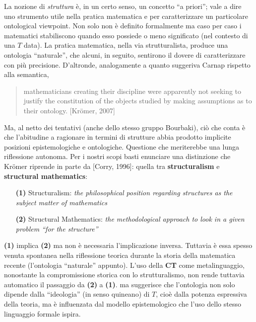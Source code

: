 \documentclass[a4paper, 11pt]{article}
\begin{document}
La nozione di \textit{struttura} è, in un certo senso, un concetto ``a priori''; vale a dire uno strumento utile nella pratica matematica e per caratterizzare un particolare ontological viewpoint. Non solo non è definito formalmente ma caso per caso i matematici stabiliscono quando esso possiede o meno significato (nel contesto di una $T$ data).
\endfo
La pratica matematica, nella via strutturalista, produce una ontologia ``naturale'', che alcuni, in seguito, sentirono il dovere di caratterizzare con più precisione. D'altronde, analogamente a quanto suggeriva Carnap rispetto alla semantica,
\begin{quotation}
	mathematicians creating
	their discipline were apparently not seeking to justify the constitution of the
	objects studied by making assumptions as to their ontology. [Kr\"omer, 2007]
\end{quotation}
Ma, al netto dei tentativi (anche dello stesso gruppo Bourbaki), \endfo ciò che conta è che l'abitudine a ragionare in termini di strutture abbia prodotto implicite posizioni epistemologiche e ontologiche.
Questione che meriterebbe una lunga riflessione autonoma. Per i nostri scopi basti enunciare una distinzione che Kr\"omer riprende in parte da [Corry, 1996]: quella tra \textbf{structuralism} e \textbf{structural mathematics}:
\begin{itemize}
	\item[\textbf{(1)}] Structuralism: \textit{the philosophical
		      position regarding structures as the subject matter of mathematics}
	\item[\textbf{(2)}] Structural Mathematics: \textit{the methodological approach to look in a given problem
		      “for the structure”}
\end{itemize}
\textbf{(1)} implica \textbf{(2)} ma non è necessaria l'implicazione inversa. Tuttavia è essa spesso venuta spontanea nella riflessione teorica durante la storia della matematica recente (l'ontologia ``naturale'' appunto). L'uso della \textbf{CT} come metalinguaggio, nonostante la compromissione storica con lo strutturalismo, non rende tuttavia automatico il passaggio da \textbf{(2)} a \textbf{(1)}. ma suggerisce che l'ontologia non solo dipende dalla ``ideologia'' (in senso quineano) di $T$, cioè dalla potenza espressiva della teoria, ma è influenzata dal modello epistemologico che l'uso dello stesso linguaggio formale ispira.
\end{document}
